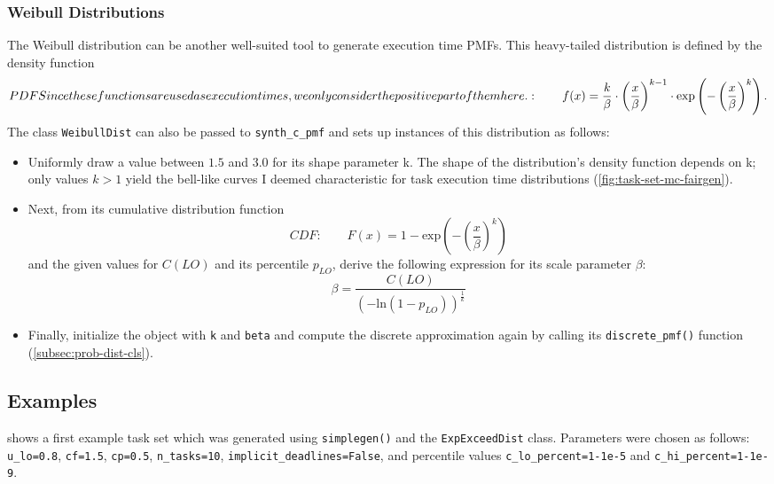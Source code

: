 \documentclass[a4paper,oneside]{csthesis}
\begin{document}
\subsubsection{Weibull Distributions}
The Weibull distribution can be another well-suited tool to generate execution time PMFs. This heavy-tailed distribution is defined by the density function
\begin{equation}
    PDF\footnote{Since these functions are used as execution times, we only consider the positive part of them here.} : \qquad f(x) = \frac{k}{\beta} \cdot \left( \frac{x}{\beta} \right)^{k - 1} \cdot \text{exp}\left(-\left(\frac{x}{\beta}\right)^k\right).
\end{equation}
The class \texttt{WeibullDist} can also be passed to \texttt{synth\_c\_pmf} and sets up instances of this distribution as follows:
\begin{itemize}
    \item Uniformly draw a value between $1.5$ and $3.0$ for its shape parameter k. The shape of the distribution's density function depends on k; only values $k > 1$ yield the bell-like curves I deemed characteristic for task execution time distributions (\cref{fig:task-set-mc-fairgen}).
    \item Next, from its cumulative distribution function
    \begin{equation}
        CDF : \qquad F(x) = 1 - \text{exp}\left(-\left(\frac{x}{\beta}\right)^k\right)
    \end{equation}
     and the given values for $C(LO)$ and its percentile $p_{LO}$, derive the following expression for its scale parameter $\beta$:
    \begin{equation}
        \beta = \frac{C(LO)}{\left(-\text{ln}(1 - p_{LO})\right)^\frac{1}{k}}
    \end{equation}
    \item Finally, initialize the object with \texttt{k} and \texttt{beta} and compute the discrete approximation again by calling its \texttt{discrete\_pmf()} function (\cref{subsec:prob-dist-cls}).
\end{itemize}

\subsection{Examples}
\label{subsec:synth-ex}
 shows a first example task set which was generated using \texttt{simplegen()} and the \texttt{ExpExceedDist} class. Parameters were chosen as follows: \texttt{u\_lo=0.8}, \texttt{cf=1.5}, \texttt{cp=0.5}, \texttt{n\_tasks=10}, \texttt{implicit\_deadlines=False}, and percentile values \texttt{c\_lo\_percent=1-1e-5} and \texttt{c\_hi\_percent=1-1e-9}.
\end{document}
